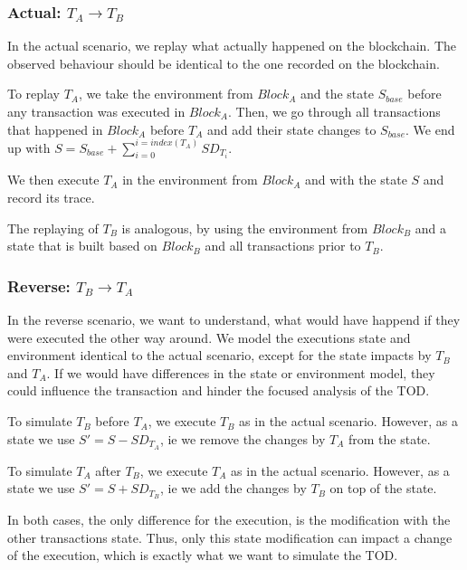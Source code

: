 \documentclass[draft,final]{vutinfth} %
\begin{document}
\subsubsection{Actual: $T_A \rightarrow T_B$}
In the actual scenario, we replay what actually happened on the blockchain. The observed behaviour should be identical to the one recorded on the blockchain.

To replay $T_A$, we take the environment from $Block_A$ and the state $S_{base}$ before any transaction was executed in $Block_A$. Then, we go through all transactions that happened in $Block_A$ before $T_A$ and add their state changes to $S_{base}$. We end up with $S = S_{base} + \sum_{i=0}^{i=index(T_A)}SD_{T_i}$.

We then execute $T_A$ in the environment from $Block_A$ and with the state $S$ and record its trace.

The replaying of $T_B$ is analogous, by using the environment from $Block_B$ and a state that is built based on $Block_B$ and all transactions prior to $T_B$.

\subsubsection{Reverse: $T_B \rightarrow T_A$}

In the reverse scenario, we want to understand, what would have happend if they were executed the other way around. We model the executions state and environment identical to the actual scenario, except for the state impacts by $T_B$ and $T_A$. If we would have differences in the state or environment model, they could influence the transaction and hinder the focused analysis of the TOD.

To simulate $T_B$ before $T_A$, we execute $T_B$ as in the actual scenario. However, as a state we use $S\prime = S - SD_{T_A}$, ie we remove the changes by $T_A$ from the state.

To simulate $T_A$ after $T_B$, we execute $T_A$ as in the actual scenario. However, as a state we use $S\prime = S + SD_{T_B}$, ie we add the changes by $T_B$ on top of the state.

In both cases, the only difference for the execution, is the modification with the other transactions state. Thus, only this state modification can impact a change of the execution, which is exactly what we want to simulate the TOD.
\end{document}
